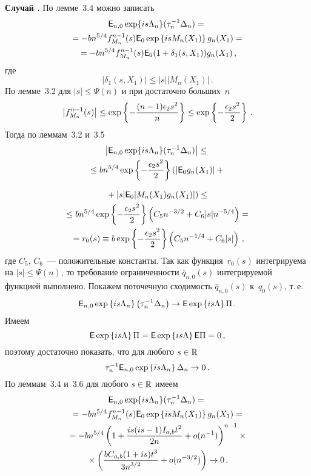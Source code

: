 \begin{multicols}{2}
\medskip

\noindent
\textbf{Случай {}.} По лемме~3.4 можно записать
\begin{multline*}
{{\sf E}}_{n,0}\exp\{is\Lambda_n\}(\tau_n^{-1}\Delta_n) ={}\\
{}= -b n^{5/4} f^{n-1}_{M_n}(s) {{\sf E}}_0 \exp\left\{is M_n(X_1)\right\} g_n(X_1) ={}\\
{}
= -b n^{5/4} f^{n-1}_{M_n}(s) {{\sf E}}_0 (1+\delta_1(s,X_1)) g_n(X_1)\,,
\end{multline*}
где
$$
|\delta_1(s,X_1)| \leq |s| |M_n(X_1)|\,.
$$
По лемме~3.2 для $|s| \leq \Psi(n)$ и при достаточно больших~$n$
\begin{equation*}
\left|f_{M_n}^{n-1}(s)\right| \leq \exp\left\{-\displaystyle\frac{\displaystyle (n-1)\epsilon_2 s^2\mathstrut}{\displaystyle n\mathstrut}\right\} \leq
\exp\left\{-\frac{\epsilon_2 s^2}{2}\right\}\,.
\end{equation*}
Тогда по леммам~3.2 и~3.5
\begin{multline*}
\left|{{\sf E}}_{n,0}\exp\{is\Lambda_n\}(\tau_n^{-1}\Delta_n)\right| \leq{}\\
{}
\leq b n^{5/4}\exp\left\{-\displaystyle\frac{\displaystyle \epsilon_2 s^2\mathstrut}{\displaystyle 2\mathstrut}\right\}  \left(
\left|{{\sf E}}_0g_n(X_1)\right| +{}\right.
\end{multline*}

\noindent
\begin{multline*}
\left.{}+ |s|{{\sf E}}_0 |M_n(X_1) g_n(X_1)|\right) \leq{}\\
{}
\leq b n^{5/4} \exp\left\{-\displaystyle\frac{\displaystyle \epsilon_2 s^2\mathstrut}{\displaystyle 2\mathstrut}\right\} \left(C_5n^{-3/2} + C_6|s|n^{-5/4}\right) ={}\\
{}
= r_0(s) \equiv b \exp\left\{-\displaystyle\frac{\displaystyle \epsilon_2 s^2\mathstrut}{\displaystyle 2\mathstrut}\right\} \left(C_5n^{-1/4} + C_6|s|\right)\,,
\end{multline*}
где $C_5$, $C_6$~--- положительные константы. Так как функция~$r_0(s)$ интегрируема на $|s|\leq\Psi(n)$, 
то требование ограниченности $\bar{q}_{n,0}(s)$ интегрируемой функцией выполнено. 
Покажем поточечную сходимость $\bar{q}_{n,0}(s)$ к~$q_0(s)$, т.\,е.
$$
{{\sf E}}_{n,0} \exp\left\{is\Lambda_n\right\} \left(\tau_n^{-1} \Delta_n\right) \to 
{{\sf E}} \exp\left\{is\Lambda\right\} \Pi\,.
$$
Имеем
$$
{{\sf E}} \exp\left\{is\Lambda\right\} \Pi = {{\sf E}} \exp\left\{is\Lambda\right\} {{\sf E}} \Pi = 0\,,
$$
поэтому достаточно показать, что для любого $s\in{\mathbb{R}}$
$$
\tau_n^{-1} {{\sf E}}_{n,0} \exp\left\{is\Lambda_n\right\} \Delta_n \to 0\,.
$$
По леммам~3.4 и~3.6 для любого $s\in{\mathbb{R}}$ имеем
\begin{multline*}
{{\sf E}}_{n,0}\exp\{is\Lambda_n\}(\tau_n^{-1}\Delta_n) ={}\\
{}= -b n^{5/4} f^{n-1}_{M_n}(s) {{\sf E}}_0 \exp\left\{isM_n(X_1)\right\} g_n(X_1) ={}\\
{}
= -b n^{5/4} \left(1+\displaystyle\frac{\displaystyle is(is-1)I_{a,b} t^2\mathstrut}{\displaystyle 2n\mathstrut}+ o(n^{-1})\right)^{n-1} \times{}\\
{}\times
\left(\displaystyle\frac{\displaystyle b C_{a,b} (1+is)t^3\mathstrut}{\displaystyle 3n^{3/2}\mathstrut}+  o(n^{-3/2})\right) \to 0\,.
\end{multline*}


\end{multicols}
